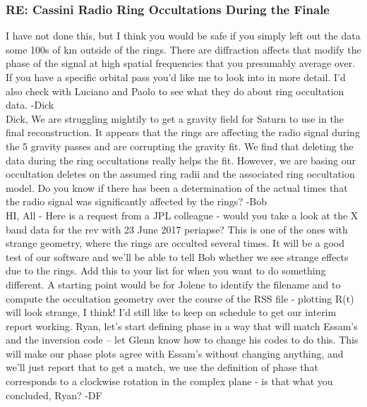 \documentclass[crop=false,class=article,oneside]{standalone}
\begin{document}
\subsubsection{\footnotesize RE: Cassini Radio Ring Occultations During the Finale}
I have not done this, but I think you would be safe if you simply left out the data some 100s of km outside of the rings. There are diffraction affects that modify the phase of the signal at high spatial frequencies that you presumably average over. If you have a specific orbital pass you'd like me to look into in more detail. I'd also check with Luciano and Paolo to see what they do about ring occultation data. -Dick\\
Dick, We are struggling mightily to get a gravity field for Saturn to use in the final reconstruction. It appears that the rings are affecting the radio signal during the 5 gravity passes and are corrupting the gravity fit. We find that deleting the data during the ring occultations really helps the fit. However, we are basing our occultation deletes on the assumed ring radii and the associated ring occultation model. Do you know if there has been a determination of the actual times that the radio signal was significantly affected by the rings? -Bob\\
HI, All - Here is a request from a JPL colleague - would you take a look at the X band data for the rev with 23 June 2017 periapse? This is one of the ones with strange geometry, where the rings are occulted several times. It will be a good test of our software and we'll be able to tell Bob whether we see strange effects due to the rings. Add this to your list for when you want to do something different. A starting point would be for Jolene to identify the filename and to compute the occultation geometry over the course of the RSS file - plotting R(t) will look strange, I think! I'd still like to keep on schedule to get our interim report working. Ryan, let's start defining phase in a way that will match Essam's and the inversion code -- let Glenn know how to change his codes to do this. This will make our phase plots agree with Essam's without changing anything, and we'll just report that to get a match, we use the definition of phase that corresponds to a clockwise rotation in the complex plane - is that what you concluded, Ryan? -DF
\end{document}
